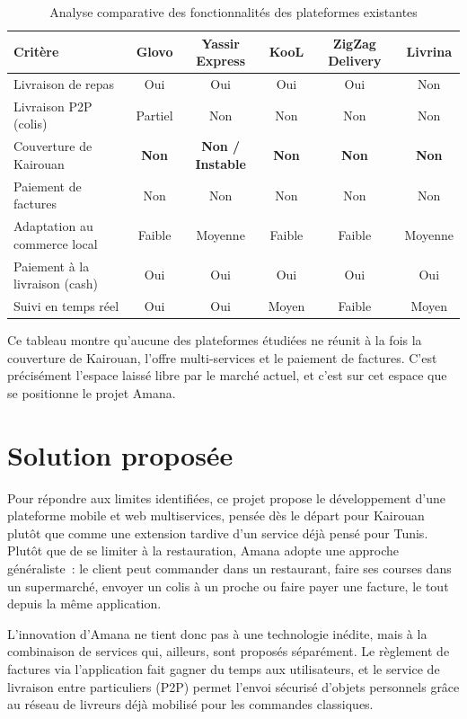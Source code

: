 \documentclass[12pt,fleqn,a4paper]{report}
\begin{document}
\begin{justify}
\begin{table}[h!]
\centering
\scriptsize
\setlength{\tabcolsep}{3pt}
\renewcommand{\arraystretch}{1.25}
\begin{tabular}{|l|c|c|c|c|c|}
\hline
\textbf{Critère} & \textbf{Glovo} & \textbf{Yassir Express} & \textbf{KooL} & \textbf{ZigZag Delivery} & \textbf{Livrina} \\ \hline
Livraison de repas & Oui & Oui & Oui & Oui & Non \\ \hline
Livraison P2P (colis) & Partiel & Non & Non & Non & Non \\ \hline
Couverture de Kairouan & \textbf{Non} & \textbf{Non / Instable} & \textbf{Non} & \textbf{Non} & \textbf{Non} \\ \hline
Paiement de factures & Non & Non & Non & Non & Non \\ \hline
Adaptation au commerce local & Faible & Moyenne & Faible & Faible & Moyenne \\ \hline
Paiement à la livraison (cash) & Oui & Oui & Oui & Oui & Oui \\ \hline
Suivi en temps réel & Oui & Oui & Moyen & Faible & Moyen \\ \hline
\end{tabular}
\caption{Analyse comparative des fonctionnalités des plateformes existantes}
\label{tab:comparatif_existant}
\end{table}

Ce tableau montre qu'aucune des plateformes étudiées ne réunit à la fois la couverture de Kairouan, l'offre multi-services et le paiement de factures. C'est précisément l'espace laissé libre par le marché actuel, et c'est sur cet espace que se positionne le projet Amana.

\section{Solution proposée}

Pour répondre aux limites identifiées, ce projet propose le développement d'une plateforme mobile et web multiservices, pensée dès le départ pour Kairouan plutôt que comme une extension tardive d'un service déjà pensé pour Tunis. Plutôt que de se limiter à la restauration, Amana adopte une approche généraliste~: le client peut commander dans un restaurant, faire ses courses dans un supermarché, envoyer un colis à un proche ou faire payer une facture, le tout depuis la même application.

L'innovation d'Amana ne tient donc pas à une technologie inédite, mais à la combinaison de services qui, ailleurs, sont proposés séparément. Le règlement de factures via l'application fait gagner du temps aux utilisateurs, et le service de livraison entre particuliers (P2P) permet l'envoi sécurisé d'objets personnels grâce au réseau de livreurs déjà mobilisé pour les commandes classiques.


\end{justify}
\end{document}
